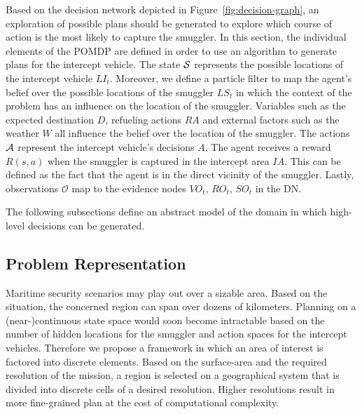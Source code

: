 \documentclass[conference]{IEEEtran}
\begin{document}
Based on the decision network depicted in Figure~\ref{fig:decision-graph}, an exploration of possible plans should be generated to explore which course of action is the most likely to capture the smuggler. In this section, the individual elements of the POMDP are defined in order to use an algorithm to generate plans for the intercept vehicle. The state $\S$ represents the possible locations of the intercept vehicle $LI_t$. Moreover, we define a particle filter to map the agent's belief over the possible locations of the smuggler $LS_t$ in which the context of the problem has an influence on the location of the smuggler. Variables such as the expected destination $D$, refueling actions $RA$ and external factors such as the weather $W$ all influence the belief over the location of the smuggler. The actions $\A$ represent the intercept vehicle's decisions $A$. The agent receives a reward $R(s,a)$ when the smuggler is captured in the intercept area $IA$. This can be defined as the fact that the agent is in the direct vicinity of the smuggler. Lastly, observations $\mathcal{O}$ map to the evidence nodes $VO_t$, $RO_t$, $SO_t$ in the DN.


The following subsections define an abstract model of the domain in which high-level decisions can be generated.

\subsection{Problem Representation}
\label{sub:problem-rep}

Maritime security scenarios may play out over a sizable area. Based on the situation, the concerned region can span over dozens of kilometers. Planning on a (near-)continuous state space would soon become intractable based on the number of hidden locations for the smuggler and action spaces for the intercept vehicles. Therefore we propose a framework in which an area of interest is factored into discrete elements. Based on the surface-area and the required resolution of the mission, a region is selected on a geographical system that is divided into discrete cells of a desired resolution. Higher resolutions result in more fine-grained plan at the cost of computational complexity.
\end{document}
